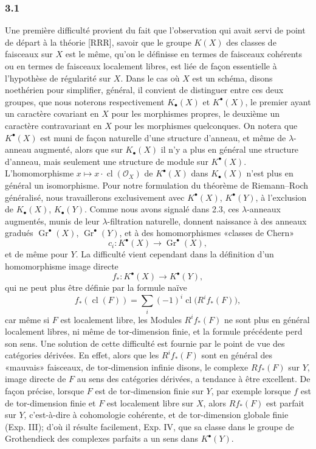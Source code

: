\documentclass[11pt]{article}
\newcommand{\Gr}{\operatorname{Gr}}
\newcommand{\cl}{\operatorname{cl}}
\providecommand{\Gr}{\operatorname{Gr}}
\providecommand{\Gr}{\operatorname{G}}
\begin{document}
\subsubsection*{3.1}
Une première difficulté provient du fait que l'observation qui avait servi de point de départ à la théorie [RRR], savoir que le groupe $K(X)$ des classes de faisceaux sur $X$ est le même, qu'on le définisse en termes de faisceaux cohérents ou en termes de faisceaux localement libres, est liée de façon essentielle à l'hypothèse de régularité sur $X$. Dans le cas où $X$ est un schéma, disons noethérien pour simplifier, général, il convient de distinguer entre ces deux groupes, que nous noterons respectivement $K_\bullet(X)$ et $K^\bullet(X)$, le premier ayant un caractère covariant en $X$ pour les morphismes propres, le deuxième un caractère contravariant en $X$ pour les morphismes quelconques. On notera que $K^\bullet(X)$ est muni de façon naturelle d'une structure d'anneau, et même de $\lambda$-anneau augmenté, alors que sur $K_\bullet(X)$ il n'y a plus en général une structure d'anneau, mais seulement une structure de module sur $K^\bullet(X)$. L'homomorphisme $x\mapsto x\cdot\cl(\mathcal O_X)$ de $K^\bullet(X)$ dans $K_\bullet(X)$ n'est plus en général un isomorphisme. Pour notre formulation du théorème de Riemann--Roch généralisé, nous travaillerons exclusivement avec $K^\bullet(X)$, $K^\bullet(Y)$, à l'exclusion de $K_\bullet(X)$, $K_\bullet(Y)$. Comme nous avons signalé dans 2.3, ces $\lambda$-anneaux augmentés, munis de leur $\lambda$-filtration naturelle, donnent naissance à des anneaux gradués $\Gr^\bullet(X)$, $\Gr^\bullet(Y)$, et à des homomorphismes «classes de Chern»
\[
c_i:K^\bullet(X)\longrightarrow \Gr^\bullet(X),
\]
et de même pour $Y$. La difficulté vient cependant dans la définition d'un homomorphisme image directe
\begin{equation}\tag{3.1}
f_*:K^\bullet(X)\longrightarrow K^\bullet(Y),
\end{equation}
qui ne peut plus être définie par la formule naïve
\[
f_*(\cl(F))=\sum_i(-1)^i\cl\bigl(R^if_*(F)\bigr),
\]
car même si $F$ est localement libre, les Modules $R^if_*(F)$ ne sont plus en général localement libres, ni même de tor-dimension finie, et la formule précédente perd son sens. Une solution de cette difficulté est fournie par le point de vue des catégories dérivées. En effet, alors que les $R^if_*(F)$ sont en général des «mauvais» faisceaux, de tor-dimension infinie disons, le complexe $Rf_*(F)$ sur $Y$, image directe de $F$ au sens des catégories dérivées, a tendance à être excellent. De façon précise, lorsque $F$ est de tor-dimension finie sur $Y$, par exemple lorsque $f$ est de tor-dimension finie et $F$ est localement libre sur $X$, alors $Rf_*(F)$ est parfait sur $Y$, c'est-à-dire à cohomologie cohérente, et de tor-dimension globale finie (Exp. III); d'où il résulte facilement, Exp. IV, que sa classe dans le groupe de Grothendieck des complexes parfaits a un sens dans $K^\bullet(Y)$.
\end{document}
